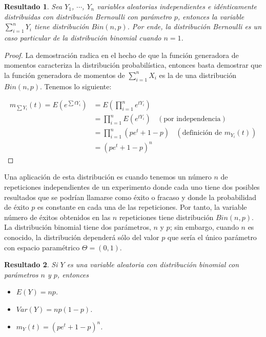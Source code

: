 \documentclass[
  10pt,
  spanish,
]{book}
\providecommand{\tightlist}{%
  \setlength{\itemsep}{0pt}\setlength{\parskip}{0pt}}
\newtheorem{proposition}{Resultado}[chapter]
\theoremstyle{definition}
\theoremstyle{definition}
\theoremstyle{definition}
\theoremstyle{definition}
\theoremstyle{remark}
\begin{document}
\begin{proposition}
\protect\hypertarget{prp:unnamed-chunk-8}{}{\label{prp:unnamed-chunk-8} }Sea \(Y_1\), \(\cdots\), \(Y_n\) variables aleatorias independientes e idénticamente distribuidas con distribución Bernoulli con parámetro \(p\),
entonces la variable \(\sum_{i=1}^nY_i\) tiene distribución \(Bin(n,p)\). Por ende, la distribución Bernoulli es un caso particular de la distribución binomial cuando \(n=1\).
\end{proposition}

\begin{proof}
{}La demostración radica en el hecho de que la función generadora de momentos caracteriza la distribución probabilística, entonces basta demostrar que la función generadora de momentos de \(\sum_{i=1}^nX_i\) es la de una distribución \(Bin(n,p)\). Tenemos lo siguiente:

\begin{align*}
m_{\sum Y_i}(t)=E(e^{\sum tY_i})&=E(\prod_{i=1}^ne^{tY_i})\\
               &=\prod_{i=1}^nE(e^{tY_i})\ \ \ \ (\text{por independencia})\\
               &=\prod_{i=1}^n(pe^t+1-p)\ \ \ \ (\text{definición de $m_{Y_i}(t)$})\\
               &=(pe^t+1-p)^n
\end{align*}
\end{proof}

Una aplicación de esta distribución es cuando tenemos un número \(n\) de repeticiones independientes de un experimento donde cada uno tiene dos
posibles resultados que se podrían llamarse como éxito o fracaso y donde la probabilidad de éxito \(p\) es constante en cada una de las repeticiones. Por tanto, la variable número de éxitos obtenidos en las \(n\) repeticiones tiene distribución \(Bin(n,p)\). La distribución binomial tiene dos parámetros, \(n\) y \(p\); sin embargo, cuando \(n\) es conocido, la distribución dependerá sólo del valor \(p\) que sería el único parámetro con espacio paramétrico \(\Theta=(0,1)\).

\begin{proposition}
\protect\hypertarget{prp:unnamed-chunk-10}{}{\label{prp:unnamed-chunk-10} }Si \(Y\) es una variable aleatoria con distribución binomial con parámetros \(n\) y \(p\), entonces

\begin{itemize}
\tightlist
\item
  \(E(Y)=np\).
\item
  \(Var(Y)=np(1-p)\).
\item
  \(m_Y(t)=(pe^t+1-p)^n\).
\end{itemize}
\end{proposition}
\end{document}
